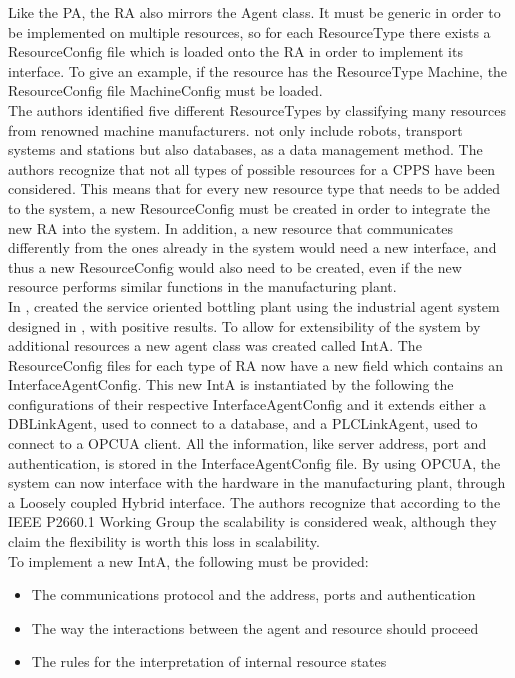 Like the \acrshort{PA}, the \acrshort{RA} also mirrors the Agent class. It must be generic in order to be implemented on multiple resources, so for each ResourceType there exists a ResourceConfig file which is loaded onto the \acrshort{RA} in order to implement its interface. To give an example, if the resource has the ResourceType Machine, the ResourceConfig file MachineConfig must be loaded.\\

The authors identified five different ResourceTypes by classifying many resources from renowned machine manufacturers.  not only include robots, transport systems and stations but also databases, as a data management method. The authors recognize that not all types of possible resources for a \acrshort{CPPS} have been considered. This means that for every new resource type that needs to be added to the system, a new ResourceConfig must be created in order to integrate the new \acrshort{RA} into the system. In addition, a new resource that communicates differently from the ones already in the system would need a new interface, and thus a new ResourceConfig would also need to be created, even if the new resource performs similar functions in the manufacturing plant.\\

In \cite{bottling_plant_part2}, \citeauthor{bottling_plant_part2} created the service oriented bottling plant using the industrial agent system designed in \cite{bottling_plant_part1}, with positive results. To allow for extensibility of the system by additional resources a new agent class was created called \acrfull{IntA}. The ResourceConfig files for each type of \acrshort{RA} now have a new field which contains an InterfaceAgentConfig. This new \acrshort{IntA} is instantiated by the  following the configurations of their respective InterfaceAgentConfig and it extends either a DBLinkAgent, used to connect to a database, and a PLCLinkAgent, used to connect to a \acrshort{OPCUA} client. All the information, like server address, port and authentication, is stored in the InterfaceAgentConfig file. By using \acrshort{OPCUA}, the system can now interface with the hardware in the manufacturing plant, through a Loosely coupled Hybrid interface. The authors recognize that according to the IEEE P2660.1 Working Group the scalability is considered weak, although they claim the flexibility is worth this loss in scalability.\\

To implement a new \acrshort{IntA}, the following must be provided:
\begin{itemize}
	\item The communications protocol and the address, ports and authentication
	\item The way the interactions between the agent and resource should proceed
	\item The rules for the interpretation of internal resource states
\end{itemize}

